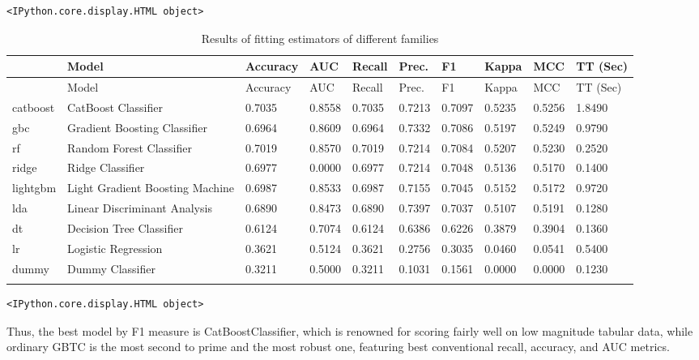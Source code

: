 \documentclass[
  letterpaper,
  DIV=11,
  numbers=noendperiod]{scrartcl}
\begin{document}
\begin{verbatim}
<IPython.core.display.HTML object>
\end{verbatim}

\hypertarget{tbl-leaderboard}{}
\begin{longtable}[]{@{}llllllllll@{}}
\toprule\noalign{}
~ & Model & Accuracy & AUC & Recall & Prec. & F1 & Kappa & MCC & TT
(Sec) \\
\midrule\noalign{}
\endfirsthead
\toprule\noalign{}
~ & Model & Accuracy & AUC & Recall & Prec. & F1 & Kappa & MCC & TT
(Sec) \\
\midrule\noalign{}
\endhead
\bottomrule\noalign{}
\endlastfoot
catboost & CatBoost Classifier & 0.7035 & 0.8558 & 0.7035 & 0.7213 &
0.7097 & 0.5235 & 0.5256 & 1.8490 \\
gbc & Gradient Boosting Classifier & 0.6964 & 0.8609 & 0.6964 & 0.7332 &
0.7086 & 0.5197 & 0.5249 & 0.9790 \\
rf & Random Forest Classifier & 0.7019 & 0.8570 & 0.7019 & 0.7214 &
0.7084 & 0.5207 & 0.5230 & 0.2520 \\
ridge & Ridge Classifier & 0.6977 & 0.0000 & 0.6977 & 0.7214 & 0.7048 &
0.5136 & 0.5170 & 0.1400 \\
lightgbm & Light Gradient Boosting Machine & 0.6987 & 0.8533 & 0.6987 &
0.7155 & 0.7045 & 0.5152 & 0.5172 & 0.9720 \\
lda & Linear Discriminant Analysis & 0.6890 & 0.8473 & 0.6890 & 0.7397 &
0.7037 & 0.5107 & 0.5191 & 0.1280 \\
dt & Decision Tree Classifier & 0.6124 & 0.7074 & 0.6124 & 0.6386 &
0.6226 & 0.3879 & 0.3904 & 0.1360 \\
lr & Logistic Regression & 0.3621 & 0.5124 & 0.3621 & 0.2756 & 0.3035 &
0.0460 & 0.0541 & 0.5400 \\
dummy & Dummy Classifier & 0.3211 & 0.5000 & 0.3211 & 0.1031 & 0.1561 &
0.0000 & 0.0000 & 0.1230 \\
\caption{\label{tbl-leaderboard}Results of fitting estimators of
different families}\label{T_4418c}\tabularnewline
\end{longtable}

\begin{verbatim}
<IPython.core.display.HTML object>
\end{verbatim}

Thus, the best model by F1 measure is CatBoostClassifier, which is
renowned for scoring fairly well on low magnitude tabular data, while
ordinary GBTC is the most second to prime and the most robust one,
featuring best conventional recall, accuracy, and AUC metrics.
\end{document}
